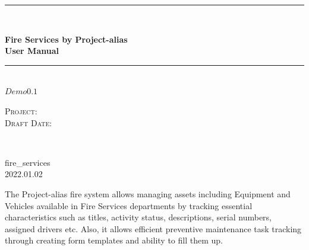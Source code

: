 \begin{titlepage}

	\centering
    \vspace*{0.5 cm}
	\rule{\linewidth}{0.2 mm} \\[0.4cm]
	\begin{spacing}{1.1}
		\huge \bfseries Fire Services by Project-alias\\[0.3cm]
		\LARGE User Manual
	\end{spacing}
	\rule{\linewidth}{0.2 mm} \\[1 cm]


	\textsc{\large $Demo 0.1$}\\[4cm]


 
	\vfill
	\noindent
	\begin{minipage}{0.7\textwidth}
		\begin{flushright}
			\textsc{Project:}\\
			\textsc{Draft Date:}\\
		\end{flushright}
	\end{minipage}~~\hspace*{1 cm}
	\begin{minipage}{0.3\textwidth}
		\begin{flushleft}
			fire_services\\
			2022.01.02\\
		\end{flushleft}
	\end{minipage}

	\clearpage

	\setcounter{page}{1}
	\justifying
	The Project-alias fire system allows managing assets including Equipment and Vehicles available in Fire Services departments by tracking essential characteristics such as titles, activity status, descriptions, serial numbers, assigned drivers etc. Also, it allows efficient preventive maintenance task tracking through creating form templates and ability to fill them up. 
	

\end{titlepage}
